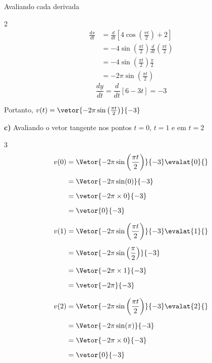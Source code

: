 \documentclass[a4paper,12pt,fleqn]{article}
\begin{document}
\begin{answer}
Avaliando cada derivada
\begin{multicols}{2}
\begin{align*}
  \frac{dx}{dt}
  & = \frac{d}{dt}\left[4\cos\left(\frac{\pi t}{2}\right) + 2\right] \\
  & = -4\sin\left(\frac{\pi t}{2}\right)\frac{d}{dt}\left(\frac{\pi t}{2}\right) \\
  & = -4\sin\left(\frac{\pi t}{2}\right)\frac{\pi}{2} \\
  & = -2\pi\sin\left(\frac{\pi t}{2}\right)
\end{align*}
\newcolumn
\[
 \frac{dy}{dt}
  = \frac{d}{dt}\left[6 - 3t\right]
  = -3
\]
\end{multicols}
\vspace{-\baselineskip}
Portanto,
\(
  v(t) = \vetor{-2\pi\sin\left(\frac{\pi t}{2}\right)}{-3}
\)

\bigskip
\textbf{c)} \quad
Avaliando o vetor tangente nos pontos $t=0$, $t=1$ e em $t=2$
\begin{multicols}{3}
\setlength{\mathindent}{0pt}
\begin{align*}
  v(0)
  & = \Vetor{-2\pi\sin\left(\frac{\pi t}{2}\right)}{-3} \evalat{0}{} \\[2mm]
  & = \Vetor{-2\pi\sin(0)}{-3} \\[2mm]
  & = \vetor{-2\pi\times 0}{-3} \\[2mm]
  & = \vetor{0}{-3}
\end{align*}

\newcolumn
\begin{align*}
  v(1)
  & = \Vetor{-2\pi\sin\left(\frac{\pi t}{2}\right)}{-3} \evalat{1}{} \\[2mm]
  & = \Vetor{-2\pi\sin\left(\frac{\pi}{2}\right)}{-3} \\[2mm]
  & = \Vetor{-2\pi\times 1}{-3} \\[2mm]
  & = \vetor{-2\pi}{-3}
\end{align*}

\newcolumn
\begin{align*}
  v(2)
  & = \Vetor{-2\pi\sin\left(\frac{\pi t}{2}\right)}{-3} \evalat{2}{} \\[2mm]
  & = \Vetor{-2\pi\sin(\pi)}{-3} \\[2mm]
  & = \Vetor{-2\pi\times 0}{-3} \\[2mm]
  & = \vetor{0}{-3}
\end{align*}
\end{multicols}

\end{answer}
\end{document}
